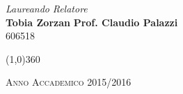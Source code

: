 \documentclass[a4paper, 12pt, twoside, openright]{book}
\begin{document}
\begin{titlepage}
\vfill
\begin{normalsize}
\begin{flushleft}
  \hspace{45pt} \textit{Laureando} \hspace{160pt} \textit{Relatore}\\
  \vspace{5pt}
  \hspace{30pt} \large{\textbf{Tobia Zorzan}} \hspace{70pt} \large{\textbf{Prof. Claudio Palazzi}}\\
  \vspace{10pt}
  \hspace{55pt} \normalsize{606518}
\end{flushleft}
\end{normalsize}

\vfill
\begin{center}
\hspace{-0.2cm}
\begin{center}
\line(1,0){360}
\end{center}

\textsc{Anno Accademico 2015/2016}
\end{center}
\end{titlepage}







\begingroup %
  \makeatletter
  \let\ps@plain\ps@empty
  \makeatother
  \tableofcontents
  \clearpage
\endgroup
\end{document}
